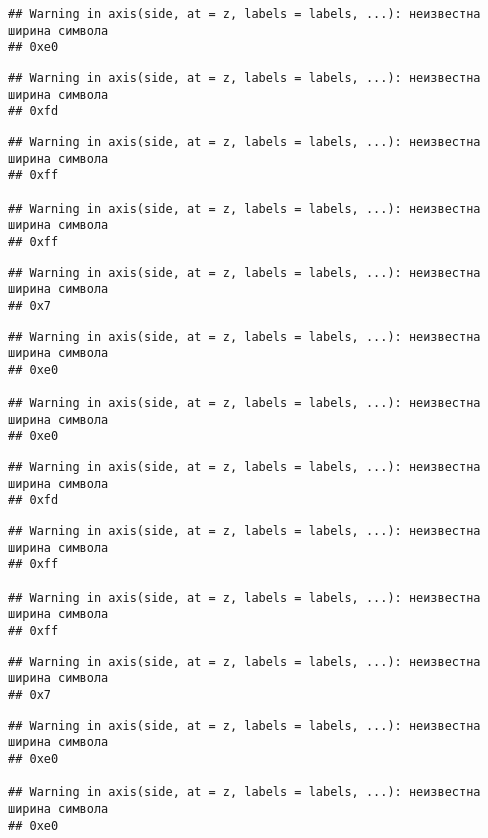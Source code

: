 \documentclass[
]{article}
\begin{document}
\begin{verbatim}
## Warning in axis(side, at = z, labels = labels, ...): неизвестна ширина символа
## 0xe0
\end{verbatim}

\begin{verbatim}
## Warning in axis(side, at = z, labels = labels, ...): неизвестна ширина символа
## 0xfd
\end{verbatim}

\begin{verbatim}
## Warning in axis(side, at = z, labels = labels, ...): неизвестна ширина символа
## 0xff

## Warning in axis(side, at = z, labels = labels, ...): неизвестна ширина символа
## 0xff
\end{verbatim}

\begin{verbatim}
## Warning in axis(side, at = z, labels = labels, ...): неизвестна ширина символа
## 0x7
\end{verbatim}

\begin{verbatim}
## Warning in axis(side, at = z, labels = labels, ...): неизвестна ширина символа
## 0xe0

## Warning in axis(side, at = z, labels = labels, ...): неизвестна ширина символа
## 0xe0
\end{verbatim}

\begin{verbatim}
## Warning in axis(side, at = z, labels = labels, ...): неизвестна ширина символа
## 0xfd
\end{verbatim}

\begin{verbatim}
## Warning in axis(side, at = z, labels = labels, ...): неизвестна ширина символа
## 0xff

## Warning in axis(side, at = z, labels = labels, ...): неизвестна ширина символа
## 0xff
\end{verbatim}

\begin{verbatim}
## Warning in axis(side, at = z, labels = labels, ...): неизвестна ширина символа
## 0x7
\end{verbatim}

\begin{verbatim}
## Warning in axis(side, at = z, labels = labels, ...): неизвестна ширина символа
## 0xe0

## Warning in axis(side, at = z, labels = labels, ...): неизвестна ширина символа
## 0xe0
\end{verbatim}
\end{document}
